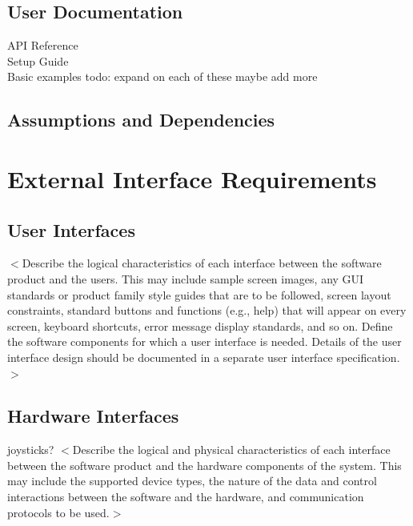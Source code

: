 \documentclass{scrreprt}
\begin{document}
\section{User Documentation}
API Reference
\\
Setup Guide
\\
Basic examples
todo: expand on each of these maybe add more

\section{Assumptions and Dependencies}



\chapter{External Interface Requirements}

\section{User Interfaces}
$<$Describe the logical characteristics of each interface between the software 
product and the users. This may include sample screen images, any GUI standards 
or product family style guides that are to be followed, screen layout 
constraints, standard buttons and functions (e.g., help) that will appear on 
every screen, keyboard shortcuts, error message display standards, and so on.  
Define the software components for which a user interface is needed. Details of 
the user interface design should be documented in a separate user interface 
specification.$>$

\section{Hardware Interfaces}
joysticks?
$<$Describe the logical and physical characteristics of each interface between 
the software product and the hardware components of the system. This may include 
the supported device types, the nature of the data and control interactions 
between the software and the hardware, and communication protocols to be 
used.$>$
\end{document}
